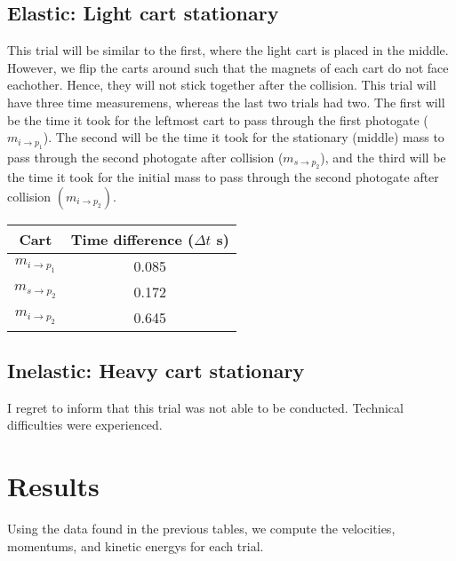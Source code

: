 \documentclass{report}
\begin{document}
    \pagebreak 
    \subsection{Elastic: Light cart stationary}
    \bigbreak \noindent 
    This trial will be similar to the first, where the light cart is placed in the middle. However, we flip the carts around such that the magnets of each cart do not face eachother. Hence, they will not stick together after the collision.
    \bigbreak \noindent 
    This trial will have three time measuremens, whereas the last two trials had two. The first will be the time it took for the leftmost cart to pass through the first photogate ($m_{i \rightarrow p_{1}} $). The second will be the time it took for the stationary (middle) mass to pass through the second photogate after collision ($m_{s \rightarrow p_{2}} $), and the third will be the time it took for the initial mass to pass through the second photogate after collision $(m_{i \rightarrow p_{2}})$.
    \bigbreak \noindent 
    \begin{center}
        \begin{tabular}{c|c}
            Cart & Time difference ($\Delta t$ s) \\
            \hline
            $m_{i\rightarrow p_{1}} $& 0.085\\
            $m_{s\rightarrow p_{2}} $ & 0.172\\
            $m_{i \rightarrow p_{2}}$ &0.645
        \end{tabular}
    \end{center}


    

    \bigbreak \noindent 
    \subsection{Inelastic: Heavy cart stationary}
    \bigbreak \noindent 
    I regret to inform that this trial was not able to be conducted. Technical difficulties were experienced.



    \bigbreak \noindent 
    \section{Results}
    \bigbreak \noindent 
    Using the data found in the previous tables, we compute the velocities, momentums, and kinetic energys for each trial. 
\end{document}
